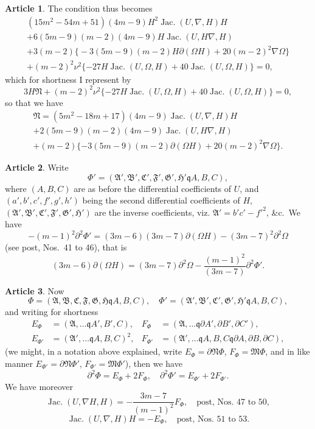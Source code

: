 \documentclass[11pt,a4paper]{article}
\theoremstyle{definition}
\newtheorem{art}{Article}[section]
\DeclareMathOperator{\Jac}{Jac.}
\newcommand{\fA}{\mathfrak{A}}
\newcommand{\fB}{\mathfrak{B}}
\newcommand{\fC}{\mathfrak{C}}
\newcommand{\fF}{\mathfrak{F}}
\newcommand{\fG}{\mathfrak{G}}
\newcommand{\fH}{\mathfrak{H}}
\newcommand{\fApr}{\mathfrak{A}'}
\newcommand{\fBpr}{\mathfrak{B}'}
\newcommand{\fCpr}{\mathfrak{C}'}
\newcommand{\fFpr}{\mathfrak{F}'}
\newcommand{\fGpr}{\mathfrak{G}'}
\newcommand{\fHpr}{\mathfrak{H}'}
\newcommand{\fM}{\mathfrak{M}}
\newcommand{\fN}{\mathfrak{N}}
\begin{document}
\setcounter{art}{19}
\begin{art}
The condition thus becomes
\begin{multline*}
(15m^2 - 54m + 51)(4m - 9)H^2 \Jac(U, \nabla, H)H \\
+ 6(5m - 9)(m-2)(4m-9)H \Jac(U, H\nabla, H) \\
+ 3(m-2)\bigl\{-3(5m-9)(m-2)H \partial(\Omega H) + 20(m-2)^2 \nabla \Omega\bigr\} \\
+ (m-2)^2 \nu^2\{-27H\Jac(U, \Omega, H) + 40\Jac(U, \Omega, H)\} = 0,
\end{multline*}
which for shortness I represent by
\[
3H\fN + (m-2)^2 \nu^2\{-27H\Jac(U, \Omega, H) + 40\Jac(U, \Omega, H)\} = 0,
\]
so that we have
\begin{multline*}
\fN = (5m^2 - 18m + 17)(4m-9)\Jac(U, \nabla, H)H \\
+ 2(5m-9)(m-2)(4m-9)\Jac(U, H\nabla, H) \\
+ (m-2)\{-3(5m-9)(m-2)\partial(\Omega H) + 20(m-2)^2 \nabla \Omega\}.
\end{multline*}
\end{art}

\begin{art}
Write
\[
\Phi' = (\fApr, \fBpr, \fCpr, \fFpr, \fGpr, \fHpr \mathbin{\mathfrak{q}} A, B, C),
\]
where $(A, B, C)$ are as before the differential coefficients of $U$, and
$(a', b', c', f', g', h')$ being the second differential coefficients of $H$,
$(\fApr, \fBpr, \fCpr, \fFpr, \fGpr, \fHpr)$ are the inverse coefficients, viz.
$\fApr = b'c' - f'^2$, \&c.\ We have
\[
-(m-1)^2 \partial^2 \Phi' = (3m-6)(3m-7)\partial(\Omega H) - (3m-7)^2 \partial^2 \Omega
\]
(see post, Nos.\ 41 to 46),
that is
\[
(3m-6)\partial(\Omega H) = (3m-7)\partial^2 \Omega - \frac{(m-1)^2}{(3m-7)}\partial^2 \Phi'.
\]
\end{art}

\setcounter{art}{21}
\begin{art}
Now
\[
\Phi = (\fA, \fB, \fC, \fF, \fG, \fH \mathbin{\mathfrak{q}} A, B, C), \quad
\Phi' = (\fApr, \fBpr, \fCpr, \fGpr, \fHpr \mathbin{\mathfrak{q}} A, B, C),
\]
and writing for shortness
\begin{align*}
E_\Phi &= (\fA, \dots \mathbin{\mathfrak{q}} A', B', C), &
F_\Phi &= (\fA, \dots \mathbin{\mathfrak{q}} \partial A', \partial B', \partial C'), \\
E_{\Phi'} &= (\fApr, \dots \mathbin{\mathfrak{q}} A, B, C)^2, &
F_{\Phi'} &= (\fApr, \dots \mathbin{\mathfrak{q}} A, B, C \mathbin{\mathfrak{q}} \partial A, \partial B, \partial C),
\end{align*}
(we might, in a notation above explained, write $E_\Phi = \partial \fN \Phi$,
$F_\Phi = \fM \Phi$, and in like manner $E_{\Phi'} = \partial \fN \Phi'$,
$F_{\Phi'} = \fM \Phi'$), then we have
\[
\partial^2 \Phi = E_\Phi + 2F_\Phi, \quad
\partial^2 \Phi' = E_{\Phi'} + 2F_{\Phi'}.
\]
We have moreover
\[
\Jac(U, \nabla H, H) = -\frac{3m-7}{(m-1)^2} F_\Phi, \quad
\text{post, Nos.\ 47 to 50},
\]
\[
\Jac(U, \nabla, H)H = -E_\Phi, \quad
\text{post, Nos.\ 51 to 53}.
\]
\end{art}
\end{document}
